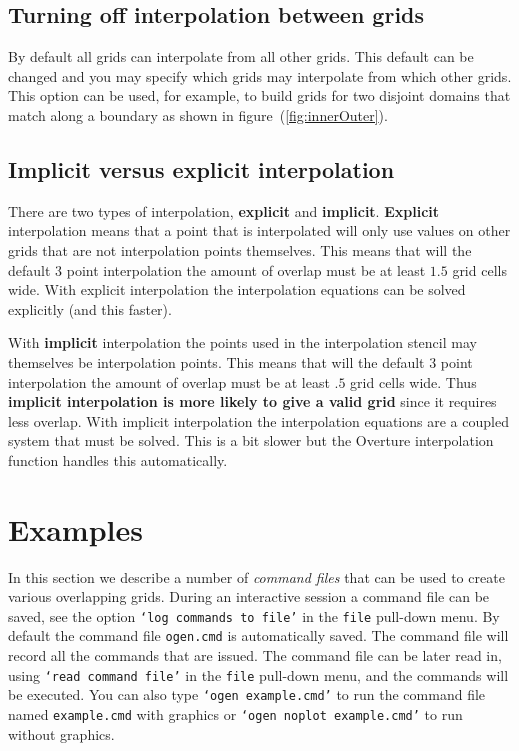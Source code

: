 \documentclass[xcolor=rgb,svgnames,dvipsnames]{article}
\newcommand{\Index}[1]{#1\index{#1}}
\begin{document}
\subsection{Turning off interpolation between grids}\label{sec:turningOffInterpolate}

  By default all grids can interpolate from all other grids. This default can be changed and you may specify
which grids may interpolate from which other grids. This option can be used, for example, to build 
grids for two disjoint domains that match along a boundary as shown in figure~(\ref{fig:innerOuter}).



\subsection{Implicit versus explicit interpolation} \label{sec:interpolation}

   There are two types of \Index{interpolation}, {\bf explicit}
 and {\bf implicit}.
{\bf Explicit} interpolation means that a point that
is interpolated will only use values on other grids that are not interpolation points themselves. 
This means that will the default 3 point interpolation the amount of overlap must be at least
$1.5$ grid cells wide. With explicit interpolation the interpolation equations can be solved 
explicitly (and this faster).

With {\bf implicit} interpolation the points used in the interpolation
stencil may themselves be interpolation points. This means  
that will the default 3 point interpolation the amount of overlap must be at least
$.5$ grid cells wide. Thus {\bf implicit interpolation is more likely to give a valid grid} since
it requires less overlap. With implicit interpolation the interpolation equations are a coupled
system that must be solved. This is a bit slower but the Overture interpolation function handles
this automatically.



\clearpage
\section{Examples}

In this section we describe a number of {\sl command files} that can be used to
create various overlapping grids. During an interactive session a command file
can be saved, see the option {\tt `log commands to file'} in the {\tt file} pull-down menu. 
By default the command file {\tt ogen.cmd} is automatically saved.
The command file will record all the commands that are issued. The command file
can be later read in, using {\tt `read command file'} in the {\tt file} pull-down menu,
and the commands will be executed. You can also type {\tt `ogen example.cmd'} to run the command file
named {\tt example.cmd} with graphics or {\tt `ogen noplot example.cmd'} to run without graphics.
\end{document}
